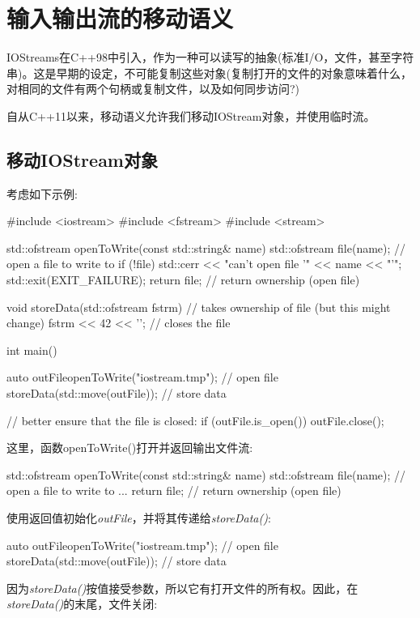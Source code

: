 \section{输入输出流的移动语义}
IOStreams在C++98中引入，作为一种可以读写的抽象(标准I/O，文件，甚至字符串)。这是早期的设定，不可能复制这些对象(复制打开的文件的对象意味着什么，对相同的文件有两个句柄或复制文件，以及如何同步访问?)

自从C++11以来，移动语义允许我们移动IOStream对象，并使用临时流。

\subsection{移动IOStream对象}

考虑如下示例:

\begin{cppcode}
#include <iostream>
#include <fstream>
#include <stream>

std::ofstream openToWrite(const std::string& name)
{
	std::ofstream file(name); // open a file to write to
	if (!file) {
		std::cerr << "can't open file '" << name << "'\n";
		std::exit(EXIT_FAILURE);
	}
	return file; // return ownership (open file)
}

void storeData(std::ofstream fstrm) // takes ownership of file (but this might change)
{
	fstrm << 42 << '\n';
} // closes the file

int main()
{
	auto outFile{openToWrite("iostream.tmp")}; // open file
	storeData(std::move(outFile)); // store data

	// better ensure that the file is closed:
	if (outFile.is_open()) {
		outFile.close();
	}
}
\end{cppcode}

这里，函数openToWrite()打开并返回输出文件流:

\begin{cppcode}
std::ofstream openToWrite(const std::string& name)
{
	std::ofstream file(name); // open a file to write to
	...
	return file; // return ownership (open file)
}
\end{cppcode}

使用返回值初始化\textit{outFile}，并将其传递给\textit{storeData()}:

\begin{cppcode}
auto outFile{openToWrite("iostream.tmp")}; // open file
storeData(std::move(outFile)); // store data
\end{cppcode}

因为\textit{storeData()}按值接受参数，所以它有打开文件的所有权。因此，在\textit{storeData()}的末尾，文件关闭:

